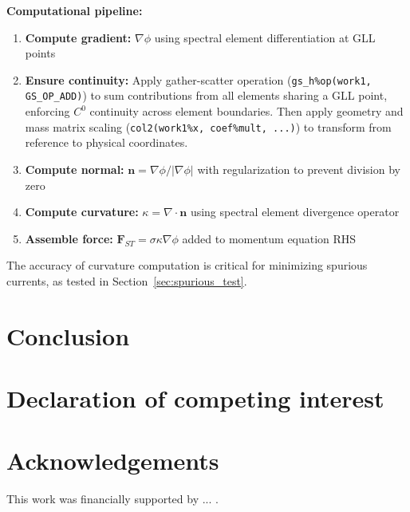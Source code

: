\documentclass{article}
\begin{document}
\textbf{Computational pipeline:}

\begin{enumerate}
    \item \textbf{Compute gradient:} $\nabla \phi$ using spectral element differentiation at GLL points
    
    \item \textbf{Ensure continuity:} Apply gather-scatter operation (\texttt{gs\_h\%op(work1, GS\_OP\_ADD)}) to sum contributions from all elements sharing a GLL point, enforcing $C^0$ continuity across element boundaries. Then apply geometry and mass matrix scaling (\texttt{col2(work1\%x, coef\%mult, ...)}) to transform from reference to physical coordinates.
    
    \item \textbf{Compute normal:} $\bm{n} = \nabla \phi/|\nabla \phi|$ with regularization to prevent division by zero
    
    \item \textbf{Compute curvature:} $\kappa = \nabla \cdot \bm{n}$ using spectral element divergence operator
    
    \item \textbf{Assemble force:} $\bm{F}_{ST} = \sigma \kappa \nabla \phi$ added to momentum equation RHS
\end{enumerate}

The accuracy of curvature computation is critical for minimizing spurious currents, as tested in Section~\ref{sec:spurious_test}.



\section{Conclusion}

\section{Declaration of competing interest}

\section{Acknowledgements}
This work was financially supported by ... .



\end{document}
